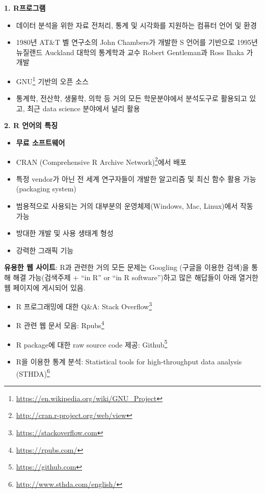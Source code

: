 \documentclass[
  11pt,
]{krantz}
\providecommand{\tightlist}{%
  \setlength{\itemsep}{0pt}\setlength{\parskip}{0pt}}
\renewcommand{\href}[2]{#2\footnote{\url{#1}}}
\let\BeginKnitrBlock\begin \let\EndKnitrBlock\end
\begin{document}
\textbf{1. R프로그램}

\begin{itemize}
\tightlist
\item
  데이터 분석을 위한 자료 전처리, 통계 및 시각화를 지원하는 컴퓨터 언어 및 환경
\item
  1980년 AT\&T 벨 연구소의 John Chambers가 개발한 S 언어를 기반으로 1995년 뉴질랜드 Auckland 대학의 통계학과 교수 Robert Gentleman과 Ross Ihaka 가 개발
\item
  \href{https://en.wikipedia.org/wiki/GNU_Project}{GNU} 기반의 오픈 소스
\item
  통계학, 전산학, 생물학, 의학 등 거의 모든 학문분야에서 분석도구로 활용되고 있고, 최근 data science 분야에서 널리 활용
\end{itemize}

\textbf{2. R 언어의 특징}

\begin{itemize}
\tightlist
\item
  \textbf{무료 소프트웨어}
\item
  \href{http://cran.r-project.org/web/view}{CRAN (Comprehensive R Archive Network)}에서 배포
\item
  특정 vendor가 아닌 전 세계 연구자들이 개발한 알고리즘 및 최신 함수 활용 가능(packaging system)
\item
  범용적으로 사용되는 거의 대부분의 운영체제(Windows, Mac, Linux)에서 작동 가능
\item
  방대한 개발 및 사용 생태계 형성
\item
  강력한 그래픽 기능
\end{itemize}

\footnotesize

\BeginKnitrBlock{rmdtip}
\textbf{유용한 웹 사이트}: R과 관련한 거의 모든 문제는 Googling (구글을 이용한 검색)을 통해 해결 가능(검색주제 + ``in R'' or ``in R software'')하고 많은 해답들이 아래 열거한 웹 페이지에 게시되어 있음.

\begin{itemize}
\tightlist
\item
  R 프로그래밍에 대한 Q\&A: \href{https://stackoverflow.com}{Stack Overflow}
\item
  R 관련 웹 문서 모음: \href{https://rpubs.com/}{Rpubs}
\item
  R package에 대한 raw source code 제공: \href{https://github.com}{Github}
\item
  R을 이용한 통계 분석: \href{http://www.sthda.com/english/}{Statistical tools for high-throughput data analysis (STHDA)}
\end{itemize}
\EndKnitrBlock{rmdtip}
\end{document}
